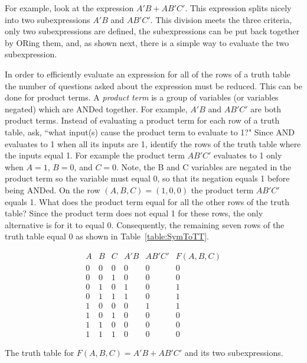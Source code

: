 For example, look at the expression $A'B + AB'C'$.  This expression splits nicely
into two subexpressions $A'B$ and  $AB'C'$.  This division meets the three
criteria, only two subexpressions are defined, the subexpressions can be put
back together by ORing them, and, as shown next, there is a simple 
way to evaluate the two subexpression.

In order to efficiently evaluate an expression for all of the rows of a 
truth table the number of questions asked about the expression must
be reduced.  This can be done for product terms.
A {\it product term}  is a group of variables 
(or variables negated) which are ANDed together.   For example, $A'B$ and  
$AB'C'$ are both product terms.  Instead of evaluating a product term for each
row of a truth table, ask, ``what input(s) cause the product term to 
evaluate to 1?"  Since AND evaluates to 1 when all its inputs are 1, 
identify the rows of the truth table where the inputs equal 1.
For example the product term $AB'C'$ evaluates to 1 only when $A=1$, $B=0$, and 
$C=0$.  Note, the B and C variables are negated in the product term so the 
variable must equal 0, so that its negation equals 1 before being ANDed.  
On the row $(A,B,C) = (1,0,0)$ the product term $AB'C'$ equals 1.  What
does the product term equal for all the other rows of the truth table?  
Since the product term does not equal 1 for these rows, the only alternative
is for it to equal 0.  Consequently, the remaining seven rows of the truth 
table equal 0 as shown in Table~\ref{table:SymToTT}.

\begin{table}
$$\begin{array}{c|c|c||c|c||c}
A & B & C & A'B & AB'C' & F(A,B,C) \\ \hline \hline
0 & 0 & 0 & 0  &  0 &  0  \\ \hline
0 & 0 & 1 & 0  &  0 &  0  \\ \hline
0 & 1 & 0 & 1  &  0 &  1  \\ \hline
0 & 1 & 1 & 1  &  0 &  1  \\ \hline
1 & 0 & 0 & 0  &  1 &  1  \\ \hline
1 & 0 & 1 & 0  &  0 &  0  \\ \hline
1 & 1 & 0 & 0  &  0 &  0  \\ \hline
1 & 1 & 1 & 0  &  0 &  0 
\end{array} $$
\caption{The truth table for $F(A,B,C) = A'B + AB'C'$ and its 
two subexpressions.}
\label{table:SymToTT}
\end{table}

